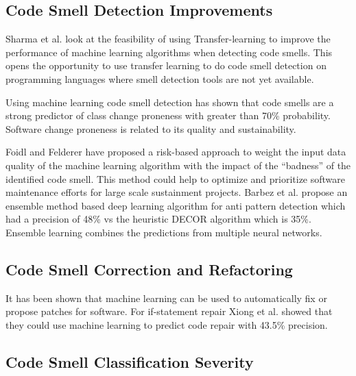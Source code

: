 \documentclass[conference]{IEEEtran}
\begin{document}
\subsection{Code Smell Detection Improvements}
Sharma et al.\cite{sharma_feasibility_2019} look at the feasibility of using Transfer-learning to improve the performance of machine learning algorithms when detecting code smells. This opens the opportunity to use transfer learning to do code smell detection on programming languages where smell detection tools are not yet available.

Using machine learning code smell detection has shown that code smells are a strong predictor of class change proneness\cite{pritam_assessment_2019} with greater than 70\% probability. Software change proneness is related to its quality and sustainability.

Foidl and Felderer have proposed\cite{foidl_risk-based_2019} a risk-based approach to weight the input data quality of the machine learning algorithm with the impact of the ``badness'' of the identified code smell. 
This method could help to optimize and prioritize software maintenance efforts for large scale sustainment projects.
Barbez et al. propose\cite{barbez_machine-learning_2019} an ensemble method based deep learning algorithm for anti pattern detection which had a precision of 48\% vs the heuristic DECOR algorithm which is 35\%. Ensemble learning combines the predictions from multiple neural networks.

\subsection{Code Smell Correction and Refactoring}
It has been shown that machine learning can be used to automatically fix or propose patches for software\cite{xiong_learning_2018}. For if-statement repair Xiong et al. showed that they could use machine learning to predict code repair with 43.5\% precision.


\subsection{Code Smell Classification Severity}
\end{document}
